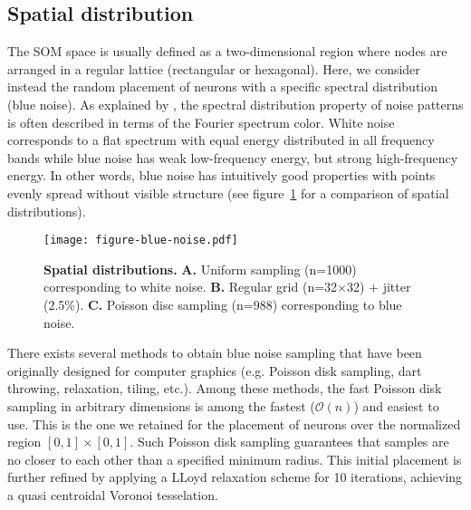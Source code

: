 \subsection{Spatial distribution} %
\label{sec:spatial_dist}

The SOM space is usually defined as a two-dimensional region where nodes are arranged in a regular lattice (rectangular or hexagonal). Here, we consider instead the random placement of neurons with a specific spectral distribution (blue noise). As explained by \citet{Zhou:2012}, the spectral distribution property of noise patterns is often described in terms of the Fourier spectrum color. White noise corresponds to a flat spectrum with equal energy distributed in all frequency bands while blue noise has weak low-frequency energy, but strong high-frequency energy. In other words, blue noise has intuitively good properties with points evenly spread without visible structure (see figure~\ref{fig:sampling} for a comparison of spatial distributions).
\begin{figure}[htbp]
  \texttt{[image: figure-blue-noise.pdf]}
  \caption{\textbf{Spatial distributions.}
    \textbf{\textsf{A.}} Uniform sampling (n=1000) corresponding to white noise.
    \textbf{\textsf{B.}} Regular grid (n=32$\times$32) + jitter (2.5\%).
    \textbf{\textsf{C.}} Poisson disc sampling (n=988) corresponding to blue noise.}
  \label{fig:sampling}
\end{figure}
There exists several methods \citep{Lagae:2008} to obtain blue noise sampling that have been originally designed for computer graphics (e.g. Poisson disk sampling, dart throwing, relaxation, tiling, etc.). Among these methods, the fast Poisson disk sampling in arbitrary dimensions \citep{Bridson:2007} is among the fastest ($\mathcal{O}(n)$) and easiest to use. This is the one we retained for the placement of neurons over the normalized region $[0,1]\times[0,1]$. Such Poisson disk sampling guarantees that samples are no closer to each other than a specified minimum radius. This initial placement is further refined by applying a LLoyd relaxation \citep{Lloyd:1982} scheme for 10 iterations, achieving a quasi centroidal Voronoi tesselation.


